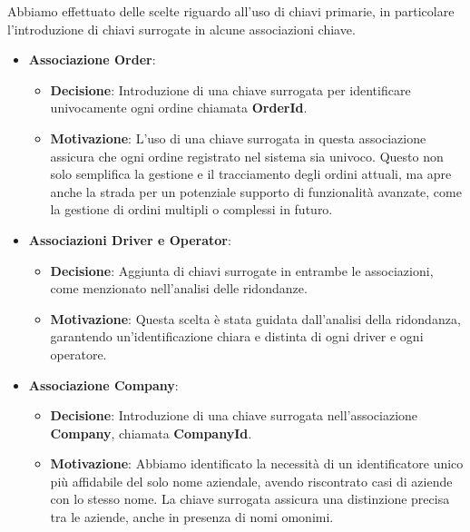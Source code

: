Abbiamo effettuato delle scelte riguardo all'uso di chiavi primarie, in particolare l'introduzione di chiavi surrogate in alcune associazioni chiave.

\begin{itemize}[leftmargin=*,label={\textbullet},itemsep=0pt,topsep=0pt,partopsep=0pt]
  \item \textbf{Associazione Order}:
        \begin{itemize}[leftmargin=*,label={\textbullet},itemsep=0pt,topsep=0pt,partopsep=0pt]
          \item \textbf{Decisione}: Introduzione di una chiave surrogata per identificare univocamente ogni ordine chiamata \textbf{OrderId}.
          \item \textbf{Motivazione}: L'uso di una chiave surrogata in questa associazione assicura che ogni ordine registrato nel sistema sia univoco. Questo non solo semplifica la gestione e il tracciamento degli ordini attuali, ma apre anche la strada per un potenziale supporto di funzionalità avanzate, come la gestione di ordini multipli o complessi in futuro.
        \end{itemize}
  \item \textbf{Associazioni Driver e Operator}:
        \begin{itemize}[leftmargin=*,label={\textbullet},itemsep=0pt,topsep=0pt,partopsep=0pt]
          \item \textbf{Decisione}: Aggiunta di chiavi surrogate in entrambe le associazioni, come menzionato nell'analisi delle ridondanze.
          \item \textbf{Motivazione}: Questa scelta è stata guidata dall'analisi della ridondanza, garantendo un'identificazione chiara e distinta di ogni driver e ogni operatore.
        \end{itemize}
  \item \textbf{Associazione Company}:
        \begin{itemize}[leftmargin=*,label={\textbullet},itemsep=0pt,topsep=0pt,partopsep=0pt]
          \item \textbf{Decisione}: Introduzione di una chiave surrogata nell'associazione \textbf{Company}, chiamata \textbf{CompanyId}.
          \item \textbf{Motivazione}: Abbiamo identificato la necessità di un identificatore unico più affidabile del solo nome aziendale, avendo riscontrato casi di aziende con lo stesso nome. La chiave surrogata assicura una distinzione precisa tra le aziende, anche in presenza di nomi omonimi.
        \end{itemize}
\end{itemize}